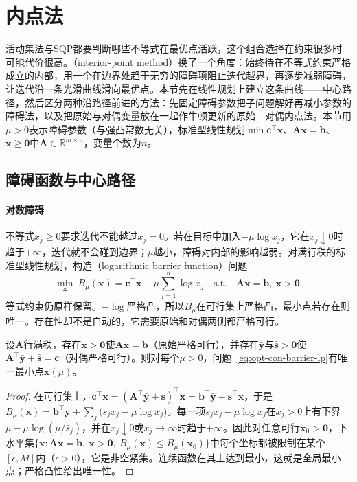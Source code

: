 \section{内点法}
\label{sec:opt-con-interior-point}

活动集法与SQP都要判断哪些不等式在最优点活跃，这个组合选择在约束很多时可能代价很高。（interior-point method）换了一个角度：始终待在不等式约束严格成立的内部，用一个在边界处趋于无穷的障碍项阻止迭代越界，再逐步减弱障碍，让迭代沿一条光滑曲线滑向最优点。本节先在线性规划上建立这条曲线——中心路径，然后区分两种沿路径前进的方法：先固定障碍参数把子问题解好再减小参数的障碍法，以及把原始与对偶变量放在一起作牛顿更新的原始—对偶内点法。本节用$\mu>0$表示障碍参数（与强凸常数无关），标准型线性规划$\min\bm c^\top\bm x$、$\bm A\bm x=\bm b$、$\bm x\geq\bm0$中$\bm A\in\mathbb R^{m\times n}$，变量个数为$n$。

\subsection{障碍函数与中心路径}
\label{sec:opt-con-central-path}

\paragraph{对数障碍}
不等式$x_j\geq0$要求迭代不能越过$x_j=0$。若在目标中加入$-\mu\log x_j$，它在$x_j\downarrow0$时趋于$+\infty$，迭代就不会碰到边界；$\mu$越小，障碍对内部的影响越弱。对满行秩的标准型线性规划，构造（logarithmic barrier function）问题
\begin{equation}
\label{eq:opt-con-barrier-lp}
  \min_{\bm x}\ B_\mu(\bm x)=\bm c^\top\bm x-\mu\sum_{j=1}^n\log x_j\quad\text{s.t.}\quad\bm A\bm x=\bm b,\ \bm x>\bm0.
\end{equation}
等式约束仍原样保留。$-\log$严格凸，所以$B_\mu$在可行集上严格凸，最小点若存在则唯一。存在性却不是自动的，它需要原始和对偶两侧都严格可行。

\begin{theorem}[中心点的存在唯一]
\label{thm:opt-con-central-path}
设$\bm A$行满秩，存在$\bm x>\bm0$使$\bm A\bm x=\bm b$（原始严格可行），并存在$\bar{\bm y}$与$\bar{\bm s}>\bm0$使$\bm A^\top\bar{\bm y}+\bar{\bm s}=\bm c$（对偶严格可行）。则对每个$\mu>0$，问题~\eqref{eq:opt-con-barrier-lp}有唯一最小点$\bm x(\mu)$。
\end{theorem}

\begin{proof}
在可行集上，$\bm c^\top\bm x=(\bm A^\top\bar{\bm y}+\bar{\bm s})^\top\bm x=\bm b^\top\bar{\bm y}+\bar{\bm s}^\top\bm x$，于是$B_\mu(\bm x)=\bm b^\top\bar{\bm y}+\sum_j\bigl(\bar s_jx_j-\mu\log x_j\bigr)$。每一项$\bar s_jx_j-\mu\log x_j$在$x_j>0$上有下界$\mu-\mu\log(\mu/\bar s_j)$，并在$x_j\downarrow0$或$x_j\to\infty$时趋于$+\infty$。因此对任意可行$\bm x_0>\bm0$，下水平集$\{\bm x:\bm A\bm x=\bm b,\ \bm x>\bm0,\ B_\mu(\bm x)\leq B_\mu(\bm x_0)\}$中每个坐标都被限制在某个$[\epsilon,M]$内（$\epsilon>0$），它是非空紧集。连续函数在其上达到最小，这就是全局最小点；严格凸性给出唯一性。
\end{proof}

